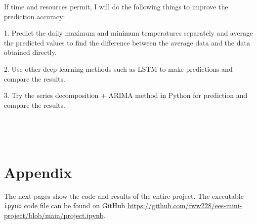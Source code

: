 \documentclass{article}
\begin{document}
If time and resources permit, I will do the following things to improve the prediction accuracy:

1. Predict the daily maximum and minimum temperatures separately and average the predicted values to find the difference between the average data and the data obtained directly.

2. Use other deep learning methods such as LSTM to make predictions and compare the results.

3. Try the series decomposition + ARIMA method in Python for prediction and compare the results.


\ 

\ 


\section{Appendix}

The next pages show the code and results of the entire project. The executable \verb|ipynb| code file can be found on GitHub \href{https://github.com/fww228/ees-mini-project/blob/main/project.ipynb}{https://github.com/fww228/ees-mini-project/blob/main/project.ipynb}.
\end{document}
